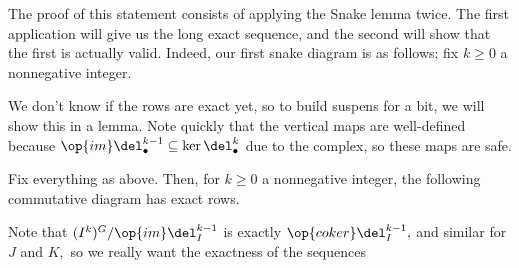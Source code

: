 The proof of this statement consists of applying the Snake lemma twice. The first application will give us the long exact sequence, and the second will show that the first is actually valid. Indeed, our first snake diagram is as follows; fix $k\ge0$ a nonnegative integer.
\begin{center}
\end{center}
We don't know if the rows are exact yet, so to build suspens for a bit, we will show this in a lemma. Note quickly that the vertical maps are well-defined because $\op{im}\del_\bullet^{k-1}\subseteq\ker\del_\bullet^k$ due to the complex, so these maps are safe.
\begin{lemma}
    Fix everything as above. Then, for $k\ge0$ a nonnegative integer, the following commutative diagram has exact rows.
    \begin{center}
    \end{center}
\end{lemma}
Note that $(I^k)^G/\op{im}\del_I^{k-1}$ is exactly $\op{coker}\del_I^{k-1},$ and similar for $J$ and $K,$ so we really want the exactness of the sequences
